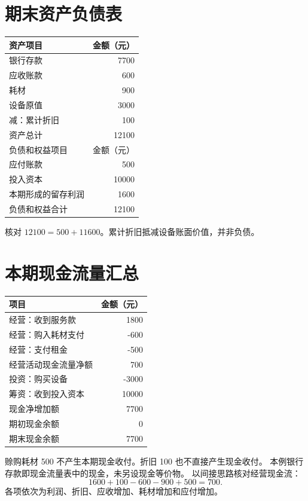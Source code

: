 \documentclass[UTF8,a4paper,fontset=fandol]{ctexart}
\begin{document}
\section{期末资产负债表}
\begin{center}
\begin{tabular}{lr}
\toprule
资产项目 & 金额（元）\\
\midrule
银行存款 & 7700\\
应收账款 & 600\\
耗材 & 900\\
设备原值 & 3000\\
减：累计折旧 & 100\\
\midrule
资产总计 & 12100\\
\midrule
负债和权益项目 & 金额（元）\\
\midrule
应付账款 & 500\\
投入资本 & 10000\\
本期形成的留存利润 & 1600\\
\midrule
负债和权益合计 & 12100\\
\bottomrule
\end{tabular}
\end{center}
核对 $12100=500+11600$。累计折旧抵减设备账面价值，并非负债。

\clearpage
\section{本期现金流量汇总}
\begin{center}
\begin{tabular}{lr}
\toprule
项目 & 金额（元）\\
\midrule
经营：收到服务款 & 1800\\
经营：购入耗材支付 & -600\\
经营：支付租金 & -500\\
经营活动现金流量净额 & 700\\
\midrule
投资：购买设备 & -3000\\
筹资：收到投入资本 & 10000\\
\midrule
现金净增加额 & 7700\\
期初现金余额 & 0\\
期末现金余额 & 7700\\
\bottomrule
\end{tabular}
\end{center}
赊购耗材 500 不产生本期现金收付。折旧 100 也不直接产生现金收付。
本例银行存款即现金流量表中的现金，未另设现金等价物。
以间接思路核对经营现金流：
\[
1600+100-600-900+500=700.
\]
各项依次为利润、折旧、应收增加、耗材增加和应付增加。
\end{document}
